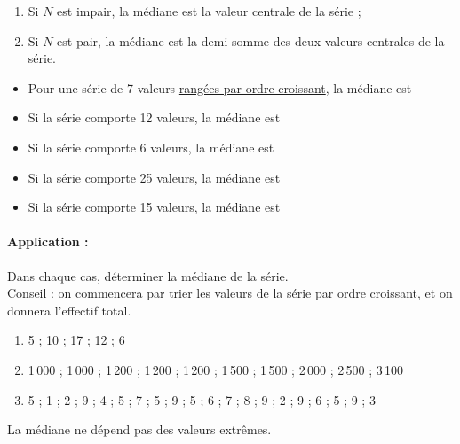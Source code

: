 \begin{enumerate}
\item Si $N$ est impair, la médiane est la valeur centrale de la série ;
\item Si $N$ est pair, la médiane est la demi-somme des deux valeurs
  centrales de la série.
\end{enumerate}

\medskip

\begin{example}
\begin{itemize}
\item Pour une série de 7 valeurs \underline{rangées par ordre
    croissant}, la médiane est \comp \comp \\[-4ex]
\item Si la série comporte 12 valeurs, la médiane est \comp \comp
  \comp \\[-1ex]
\item Si la série comporte 6 valeurs, la médiane est \comp \comp
  \comp \\[-1ex]
\item Si la série comporte 25 valeurs, la médiane est \comp \comp
  \comp \\[-1ex]
\item Si la série comporte 15 valeurs, la médiane est \comp \comp \comp
\end{itemize}
    
\end{example}



\paragraph{Application :}Dans chaque cas, déterminer la médiane de la
  série.\\
  Conseil : on commencera par trier les valeurs de la série par ordre
  croissant, et on donnera l'effectif total.


\begin{enumerate}
\item 5 ; 10 ; 17 ; 12 ; 6 
\item 1\,000 ; 1\,000 ; 1\,200 ; 1\,200 ; 1\,200 ; 1\,500 ; 1\,500 ;
  2\,000 ; 2\,500 ; 3\,100 
\item 5 ; 1 ; 2 ; 9 ; 4 ; 5 ; 7 ; 5 ; 9 ; 5 ; 6 ; 7 ; 8 ; 9 ; 2 ; 9 ;
  6 ; 5 ; 9 ; 3 
\end{enumerate}

\begin{remark}
La médiane ne dépend pas des valeurs extrêmes.

    
\end{remark}



